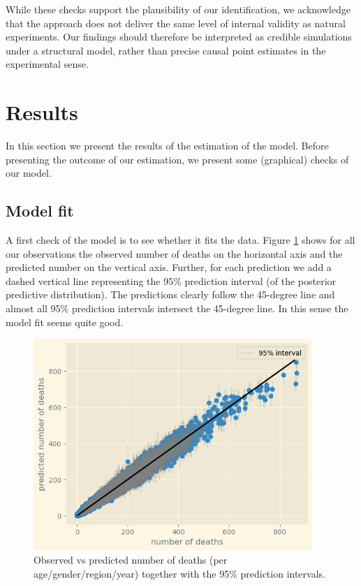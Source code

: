 \documentclass[a4paper,12pt]{article}
\begin{document}
While these checks support the plausibility of our identification, we acknowledge that the approach does not deliver the same level of internal validity as natural experiments. Our findings should therefore be interpreted as credible simulations under a structural model, rather than precise causal point estimates in the experimental sense.
\section{Results}
\label{sec:org30f91a3}

In this section we present the results of the estimation of the model. Before presenting the outcome of our estimation, we present some (graphical) checks of our model.
\subsection{Model fit}
\label{sec:orgb933036}

A first check of the model is to see whether it fits the data. Figure \ref{fig:modelfit} shows for all our observations the observed number of deaths on the horizontal axis and the predicted number on the vertical axis. Further, for each prediction we add a dashed vertical line representing the 95\% prediction interval (of the posterior predictive distribution). The predictions clearly follow the 45-degree line and almost all 95\% prediction intervals intersect the 45-degree line. In this sense the model fit seems quite good.

\begin{figure}[htbp]
\centering
\includegraphics[height=8cm]{./figures/fit_model.png}
\caption{\label{fig:modelfit}Observed vs predicted number of deaths (per age/gender/region/year) together with the 95\% prediction intervals.}
\end{figure}
\end{document}
